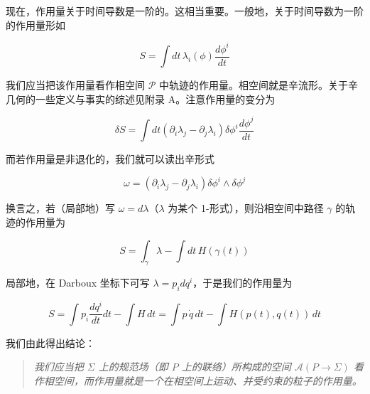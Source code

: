 现在，作用量关于时间导数是一阶的。这相当重要。一般地，关于时间导数为一阶的作用量形如

\begin{equation}
  S=\int dt\,\lambda_i(\phi)\frac{d\phi^{i}}{dt}
  \tag{2.70}
  \label{eq:2.70}
\end{equation}

我们应当把该作用量看作相空间 $\mathcal{P}$ 中轨迹的作用量。相空间就是辛流形。关于辛几何的一些定义与事实的综述见附录 A。注意作用量的变分为

\begin{equation}
  \delta S=\int dt\left(\partial_i\lambda_j-\partial_j\lambda_i\right)\delta\phi^{i}\frac{d\phi^{j}}{dt}
  \tag{2.71}
  \label{eq:2.71}
\end{equation}

而若作用量是非退化的，我们就可以读出辛形式

\begin{equation}
  \omega=\left(\partial_i\lambda_j-\partial_j\lambda_i\right)\delta\phi^{i}\wedge\delta\phi^{j}
  \tag{2.72}
  \label{eq:2.72}
\end{equation}

换言之，若（局部地）写 $\omega=d\lambda$（$\lambda$ 为某个 1-形式），则沿相空间中路径 $\gamma$ 的轨迹的作用量为

\begin{equation}
  S=\int_{\gamma}\lambda-\int dt\,H(\gamma(t))
  \tag{2.73}
  \label{eq:2.73}
\end{equation}

局部地，在 Darboux 坐标下可写 $\lambda=p_idq^{i}$，于是我们的作用量为

\begin{equation}
  S=\int p_i\frac{dq^{i}}{dt}dt-\int H\,dt=\int p\,\dot q\,dt-\int H(p(t),q(t))\,dt
  \tag{2.74}
  \label{eq:2.74}
\end{equation}

我们由此得出结论：

\begin{quote}
  \itshape 我们应当把 $\Sigma$ 上的规范场（即 $P$ 上的联络）所构成的空间 $\mathcal{A}(P\to\Sigma)$ 看作相空间，而作用量就是一个在相空间上运动、并受约束的粒子的作用量。
\end{quote}


